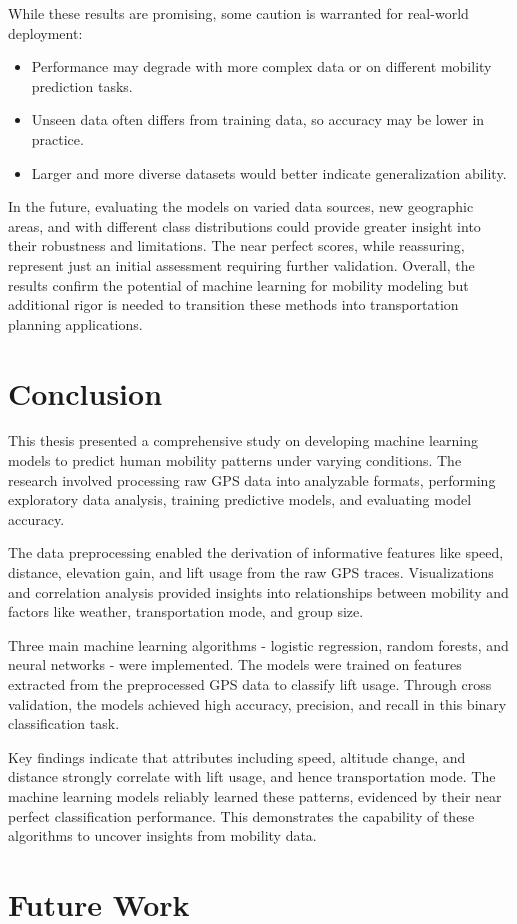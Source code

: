 While these results are promising, some caution is warranted for real-world deployment:
\begin{itemize}
	\item Performance may degrade with more complex data or on different mobility prediction tasks.
	\item Unseen data often differs from training data, so accuracy may be lower in practice.
	\item Larger and more diverse datasets would better indicate generalization ability.
\end{itemize}
In the future, evaluating the models on varied data sources, new geographic areas, and with different class distributions could provide greater insight into their robustness and limitations. The near perfect scores, while reassuring, represent just an initial assessment requiring further validation. Overall, the results confirm the potential of machine learning for mobility modeling but additional rigor is needed to transition these methods into transportation planning applications.



\section{Conclusion}
\label{sec:results:conclusion}

This thesis presented a comprehensive study on developing machine learning models to predict human mobility patterns under varying conditions. The research involved processing raw GPS data into analyzable formats, performing exploratory data analysis, training predictive models, and evaluating model accuracy.

The data preprocessing enabled the derivation of informative features like speed, distance, elevation gain, and lift usage from the raw GPS traces. Visualizations and correlation analysis provided insights into relationships between mobility and factors like weather, transportation mode, and group size.

Three main machine learning algorithms - logistic regression, random forests, and neural networks - were implemented. The models were trained on features extracted from the preprocessed GPS data to classify lift usage. Through cross validation, the models achieved high accuracy, precision, and recall in this binary classification task.

Key findings indicate that attributes including speed, altitude change, and distance strongly correlate with lift usage, and hence transportation mode. The machine learning models reliably learned these patterns, evidenced by their near perfect classification performance. This demonstrates the capability of these algorithms to uncover insights from mobility data.


\section{Future Work}
\label{sec:results:future}

